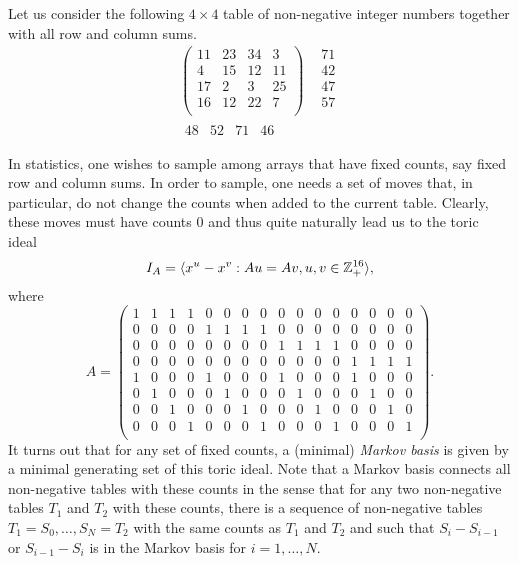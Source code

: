 Let us consider the following $4\times 4$ table of non-negative
integer numbers together with all row and column sums.
\[
\begin{array}{cc}
\left(
\begin{array}{rrrr}
11 & 23 & 34 &  3\\
 4 & 15 & 12 & 11\\
17 &  2 &  3 & 25\\
16 & 12 & 22 &  7\\
\end{array}
\right)
&
\begin{array}{r}
71\\
42\\
47\\
57\\
\end{array}\\
\begin{array}{rrrr}
48 & 52 & 71 & 46\\
\end{array} & \\
\end{array}
\]
In statistics, one wishes to sample among arrays that have fixed
counts, say fixed row and column sums. In order to sample, one needs
a set of moves that, in particular, do not change the counts when
added to the current table. Clearly, these moves must have counts
$0$ and thus quite naturally lead us to the toric ideal
\[
I_A=\langle x^u-x^v:Au=Av, u,v\in\mathbb Z^{16}_+\rangle,
\]
where
\[
A=\left(
\begin{array}{rrrrrrrrrrrrrrrr}
1 &  1 & 1 & 1 & 0 & 0 & 0 & 0 & 0 & 0 & 0 & 0 & 0 & 0 & 0 & 0\\
0 &  0 & 0 & 0 & 1 & 1 & 1 & 1 & 0 & 0 & 0 & 0 & 0 & 0 & 0 & 0\\
0 &  0 & 0 & 0 & 0 & 0 & 0 & 0 & 1 & 1 & 1 & 1 & 0 & 0 & 0 & 0\\
0 &  0 & 0 & 0 & 0 & 0 & 0 & 0 & 0 & 0 & 0 & 0 & 1 & 1 & 1 & 1\\
1 &  0 & 0 & 0 & 1 & 0 & 0 & 0 & 1 & 0 & 0 & 0 & 1 & 0 & 0 & 0\\
0 &  1 & 0 & 0 & 0 & 1 & 0 & 0 & 0 & 1 & 0 & 0 & 0 & 1 & 0 & 0\\
0 &  0 & 1 & 0 & 0 & 0 & 1 & 0 & 0 & 0 & 1 & 0 & 0 & 0 & 1 & 0\\
0 &  0 & 0 & 1 & 0 & 0 & 0 & 1 & 0 & 0 & 0 & 1 & 0 & 0 & 0 & 1\\
\end{array}
\right).
\]
It turns out that for any set of fixed counts, a (minimal)
\emph{Markov basis} is given by a minimal generating set of this
toric ideal. Note that a Markov basis connects all non-negative
tables with these counts in the sense that for any two non-negative
tables $T_1$ and $T_2$ with these counts, there is a sequence of
non-negative tables $T_1=S_0,\ldots, S_N=T_2$ with the same counts
as $T_1$ and $T_2$ and such that $S_i-S_{i-1}$ or $S_{i-1}-S_{i}$ is
in the Markov basis for $i=1,\ldots, N$.

